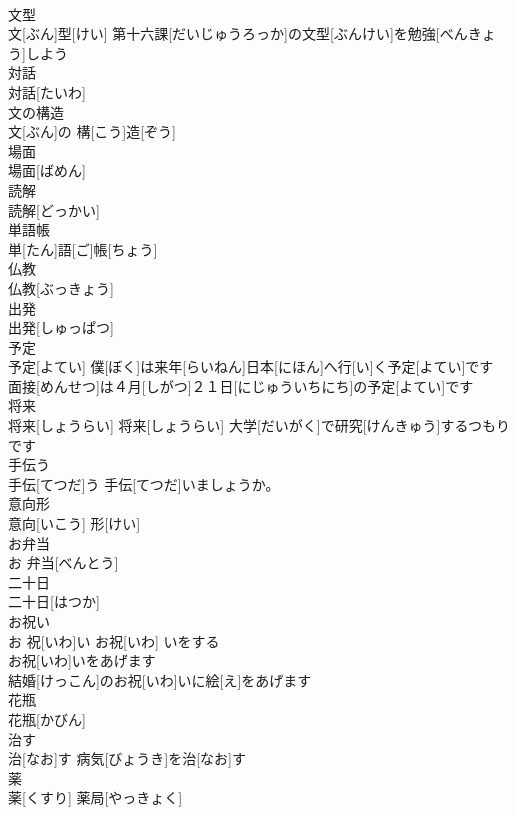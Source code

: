 \documentclass[8pt]{extreport}
\begin{document}
\begin{CJK}{UTF8}{min}
\\	文型	
\\	文[ぶん]型[けい]	第十六課[だいじゅうろっか]の文型[ぶんけい]を勉強[べんきょう]しよう 
\\	対話	
\\	対話[たいわ]	
\\	文の構造	
\\	文[ぶん]の 構[こう]造[ぞう]	
\\	場面	
\\	場面[ばめん]	
\\	読解	
\\	読解[どっかい]	
\\	単語帳	
\\	単[たん]語[ご]帳[ちょう]	
\\	仏教	
\\	仏教[ぶっきょう]	
\\	出発	
\\	出発[しゅっぱつ]	
\\	予定	
\\	予定[よてい]	僕[ぼく]は来年[らいねん]日本[にほん]へ行[い]く予定[よてい]です 
\\	面接[めんせつ]は４月[しがつ]２１日[にじゅういちにち]の予定[よてい]です 
\\	将来	
\\	将来[しょうらい]	将来[しょうらい] 大学[だいがく]で研究[けんきゅう]するつもりです 
\\	手伝う	
\\	手伝[てつだ]う	手伝[てつだ]いましょうか。 
\\	意向形	
\\	意向[いこう] 形[けい]	
\\	お弁当	
\\	お 弁当[べんとう]	
\\	二十日	
\\	二十日[はつか]	
\\	お祝い	
\\	お 祝[いわ]い	お祝[いわ] いをする 
\\	お祝[いわ]いをあげます 
\\	結婚[けっこん]のお祝[いわ]いに絵[え]をあげます 
\\	花瓶	
\\	花瓶[かびん]	
\\	治す	
\\	治[なお]す	病気[びょうき]を治[なお]す　
\\	薬	
\\	薬[くすり]	薬局[やっきょく] 

\end{CJK}
\end{document}
